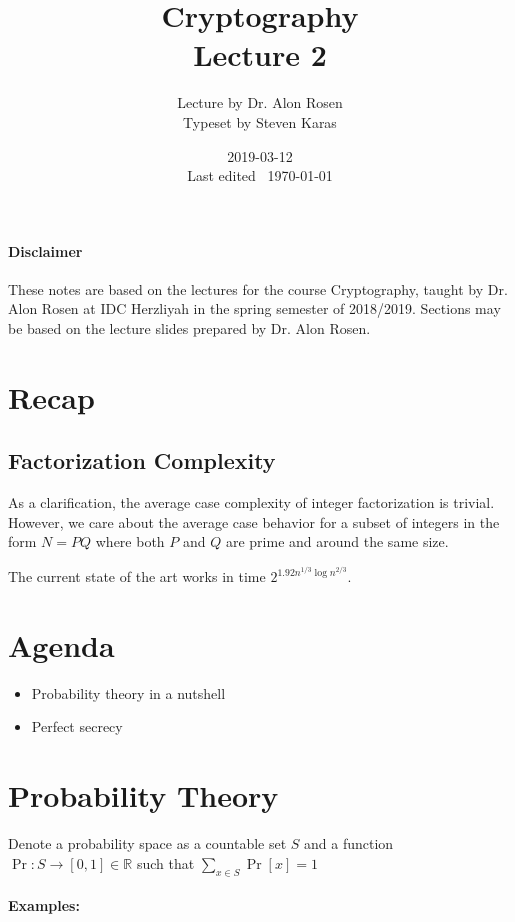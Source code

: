\documentclass{idc_msc}
\title{Cryptography \\\large Lecture 2}
\date{2019-03-12 \\ Last edited \currenttime\ \today}
\author{Lecture by Dr. Alon Rosen\\Typeset by Steven Karas}
\begin{document}
\paragraph{Disclaimer}

These notes are based on the lectures for the course Cryptography, taught by Dr. Alon Rosen at IDC Herzliyah in the spring semester of 2018/2019.
Sections may be based on the lecture slides prepared by Dr. Alon Rosen.

\nocite{Goldreich:2000:FCB:519078}
\nocite{Cormen:2001:IA:580470}

\section{Recap}

\subsection{Factorization Complexity}

As a clarification, the average case complexity of integer factorization is trivial. However, we care about the average case behavior for a subset of integers in the form \(N=PQ\) where both \(P\) and \(Q\) are prime and around the same size.

The current state of the art works in time \(2^{1.92 n^{1/3} \log n^{2/3}}\).

\section{Agenda}

\begin{itemize}
  \item Probability theory in a nutshell
  \item Perfect secrecy
\end{itemize}

\clearpage
\section{Probability Theory}

Denote a probability space as a countable set \(S\) and a function \(\Pr : S \to [0,1] \in \mathbb{R}\) such that \(\sum_{x \in S} \Pr[x] = 1\)

\paragraph{Examples:}
\end{document}
